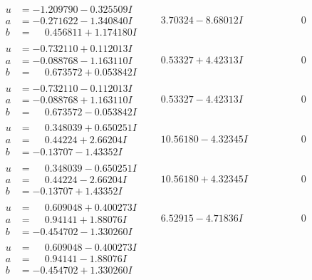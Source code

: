 \documentclass[1p]{elsarticle_modified}
\theoremstyle{definition}
\begin{document}
$$\begin{array}{c|c|c}
\begin{aligned}
u &= -1.209790 - 0.325509 I \\
a &= -0.271622 - 1.340840 I \\
b &= \phantom{-}0.456811 + 1.174180 I\end{aligned}
 & \phantom{-}3.70324 - 8.68012 I & \phantom{-0.000000 } 0 \\ \hline\begin{aligned}
u &= -0.732110 + 0.112013 I \\
a &= -0.088768 - 1.163110 I \\
b &= \phantom{-}0.673572 + 0.053842 I\end{aligned}
 & \phantom{-}0.53327 + 4.42313 I & \phantom{-0.000000 } 0 \\ \hline\begin{aligned}
u &= -0.732110 - 0.112013 I \\
a &= -0.088768 + 1.163110 I \\
b &= \phantom{-}0.673572 - 0.053842 I\end{aligned}
 & \phantom{-}0.53327 - 4.42313 I & \phantom{-0.000000 } 0 \\ \hline\begin{aligned}
u &= \phantom{-}0.348039 + 0.650251 I \\
a &= \phantom{-}0.44224 + 2.66204 I \\
b &= -0.13707 - 1.43352 I\end{aligned}
 & \phantom{-}10.56180 - 4.32345 I & \phantom{-0.000000 } 0 \\ \hline\begin{aligned}
u &= \phantom{-}0.348039 - 0.650251 I \\
a &= \phantom{-}0.44224 - 2.66204 I \\
b &= -0.13707 + 1.43352 I\end{aligned}
 & \phantom{-}10.56180 + 4.32345 I & \phantom{-0.000000 } 0 \\ \hline\begin{aligned}
u &= \phantom{-}0.609048 + 0.400273 I \\
a &= \phantom{-}0.94141 + 1.88076 I \\
b &= -0.454702 - 1.330260 I\end{aligned}
 & \phantom{-}6.52915 - 4.71836 I & \phantom{-0.000000 } 0 \\ \hline\begin{aligned}
u &= \phantom{-}0.609048 - 0.400273 I \\
a &= \phantom{-}0.94141 - 1.88076 I \\
b &= -0.454702 + 1.330260 I\end{aligned}

\end{array}$$
\end{document}
